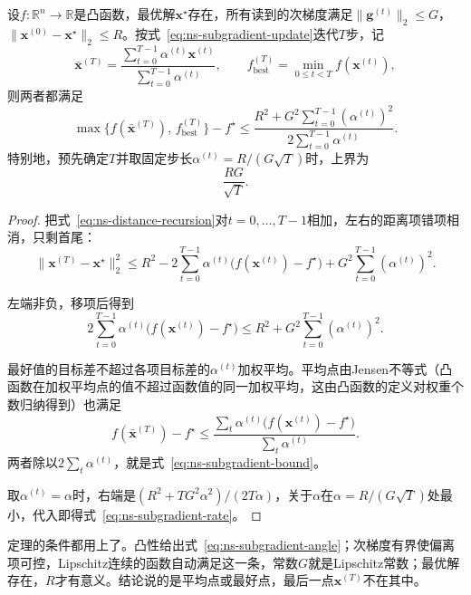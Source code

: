 \begin{theorem}[次梯度法的目标差界]
\label{thm:ns-subgradient-rate}
设$f:\mathbb{R}^n\to\mathbb{R}$是凸函数，最优解$\bm{x}^\star$存在，所有读到的次梯度满足$\lVert\bm{g}^{(t)}\rVert_2\leq G$，$\lVert\bm{x}^{(0)}-\bm{x}^\star\rVert_2\leq R$。按式~\eqref{eq:ns-subgradient-update}迭代$T$步，记
\begin{equation}
 \bar{\bm{x}}^{(T)}=\frac{\sum_{t=0}^{T-1}\alpha^{(t)}\bm{x}^{(t)}}{\sum_{t=0}^{T-1}\alpha^{(t)}},\qquad
 f_{\mathrm{best}}^{(T)}=\min_{0\leq t<T}f(\bm{x}^{(t)}),
 \label{eq:ns-subgradient-outputs}
\end{equation}
则两者都满足
\begin{equation}
 \max\bigl\{f(\bar{\bm{x}}^{(T)}),\,f_{\mathrm{best}}^{(T)}\bigr\}-f^\star
 \leq\frac{R^2+G^2\sum_{t=0}^{T-1}(\alpha^{(t)})^2}{2\sum_{t=0}^{T-1}\alpha^{(t)}}.
 \label{eq:ns-subgradient-bound}
\end{equation}
特别地，预先确定$T$并取固定步长$\alpha^{(t)}=R/(G\sqrt{T})$时，上界为
\begin{equation}
 \frac{RG}{\sqrt{T}}.
 \label{eq:ns-subgradient-rate}
\end{equation}
\end{theorem}

\begin{proof}
把式~\eqref{eq:ns-distance-recursion}对$t=0,\ldots,T-1$相加，左右的距离项错项相消，只剩首尾：
\[
 \lVert\bm{x}^{(T)}-\bm{x}^\star\rVert_2^2\leq R^2-2\sum_{t=0}^{T-1}\alpha^{(t)}\bigl(f(\bm{x}^{(t)})-f^\star\bigr)+G^2\sum_{t=0}^{T-1}(\alpha^{(t)})^2.
\]

左端非负，移项后得到
\[
 2\sum_{t=0}^{T-1}\alpha^{(t)}\bigl(f(\bm{x}^{(t)})-f^\star\bigr)\leq R^2+G^2\sum_{t=0}^{T-1}(\alpha^{(t)})^2.
\]

最好值的目标差不超过各项目标差的$\alpha^{(t)}$加权平均。平均点由Jensen不等式（凸函数在加权平均点的值不超过函数值的同一加权平均，这由凸函数的定义对权重个数归纳得到）也满足
\[
 f(\bar{\bm{x}}^{(T)})-f^\star\leq\frac{\sum_t\alpha^{(t)}\bigl(f(\bm{x}^{(t)})-f^\star\bigr)}{\sum_t\alpha^{(t)}}.
\]
两者除以$2\sum_t\alpha^{(t)}$，就是式~\eqref{eq:ns-subgradient-bound}。

取$\alpha^{(t)}=\alpha$时，右端是$(R^2+TG^2\alpha^2)/(2T\alpha)$，关于$\alpha$在$\alpha=R/(G\sqrt{T})$处最小，代入即得式~\eqref{eq:ns-subgradient-rate}。
\end{proof}

定理的条件都用上了。凸性给出式~\eqref{eq:ns-subgradient-angle}；次梯度有界使偏离项可控，Lipschitz连续的函数自动满足这一条，常数$G$就是Lipschitz常数；最优解存在，$R$才有意义。结论说的是平均点或最好点，最后一点$\bm{x}^{(T)}$不在其中。

